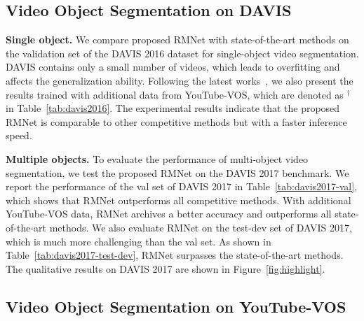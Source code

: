 \documentclass[final]{cvpr}
\begin{document}
\subsection{Video Object Segmentation on DAVIS}

\noindent \textbf{Single object.}
We compare proposed RMNet  with state-of-the-art methods on the validation set of the DAVIS 2016 dataset for single-object video segmentation.
DAVIS contains only a small number of videos, which leads to overfitting and affects the generalization ability.
Following the latest works~\cite{DBLP:conf/cvpr/ChengTHW018,DBLP:conf/iccv/OhLXK19,DBLP:conf/eccv/SeongHK20,DBLP:conf/eccv/YangWY20}, we also present the results trained with additional data from YouTube-VOS, which are denoted as $^\dag$ in Table~\ref{tab:davis2016}.
The experimental results indicate that the proposed RMNet is comparable to other competitive methods but with a faster inference speed.

\noindent \textbf{Multiple objects.}
To evaluate the performance of multi-object video segmentation, we test the proposed RMNet on the DAVIS 2017 benchmark.
We report the performance of the val set of DAVIS 2017 in Table~\ref{tab:davis2017-val}, which shows that RMNet outperforms all competitive methods.
With additional YouTube-VOS data, RMNet archives a better accuracy and outperforms all state-of-the-art methods.
We also evaluate RMNet on the test-dev set of DAVIS 2017, which is much more challenging than the val set.
As shown in Table~\ref{tab:davis2017-test-dev}, RMNet surpasses the state-of-the-art methods.
The qualitative results on DAVIS 2017 are shown in Figure~\ref{fig:highlight}.

\subsection{Video Object Segmentation on YouTube-VOS}
\end{document}
